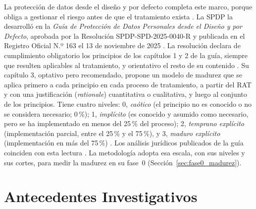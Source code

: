 La protección de datos desde el diseño y por defecto completa este marco, porque obliga a gestionar el riesgo antes de que el tratamiento exista \cite[arts.~39 y 47, num.~9]{lopdp2021}. La SPDP la desarrolló en la \textit{Guía de Protección de Datos Personales desde el Diseño y por Defecto}, aprobada por la Resolución SPDP-SPD-2025-0040-R y publicada en el Registro Oficial N.º 163 el 13 de noviembre de 2025 \cite{spdp2025diseno}. La resolución declara de cumplimiento obligatorio los principios de los capítulos 1 y 2 de la guía, siempre que resulten aplicables al tratamiento, y orientativo el resto de su contenido \cite[art.~2]{spdp2025diseno}. Su capítulo 3, optativo pero recomendado, propone un modelo de madurez que se aplica primero a cada principio en cada proceso de tratamiento, a partir del RAT y con una justificación (\textit{rationale}) cuantitativa o cualitativa, y luego al conjunto de los principios. Tiene cuatro niveles: 0, \textit{caótico} (el principio no es conocido o no se considera necesario; 0\,\%); 1, \textit{implícito} (es conocido y asumido como necesario, pero se ha implementado en menos del 25\,\% del proceso); 2, \textit{temprano explícito} (implementación parcial, entre el 25\,\% y el 75\,\%), y 3, \textit{maduro explícito} (implementación en más del 75\,\%) \cite[cap.~3]{spdp2025diseno}. Los análisis jurídicos publicados de la guía coinciden con esta lectura \cite{avl2025diseno,tzvs2025diseno}. La metodología adopta esa escala, con sus niveles y sus cortes, para medir la madurez en su fase~0 (Sección~\ref{sec:fase0_madurez}).

\section{Antecedentes Investigativos}
\label{sec:antecedentes}

